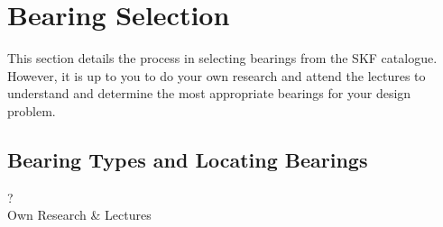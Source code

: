 \section{Bearing Selection}

This section details the process in selecting bearings from the SKF catalogue. However, it is up to you to do your own research and attend the lectures to understand and determine the most appropriate bearings for your design problem.

\subsection{Bearing Types and Locating Bearings}

\begin{framed}
  \vspace{1cm}
    \begin{center}
      {\fontsize{50}{60}\selectfont ?}\\
      Own Research \& Lectures
    \end{center}
  \vspace{1cm}
\end{framed}











